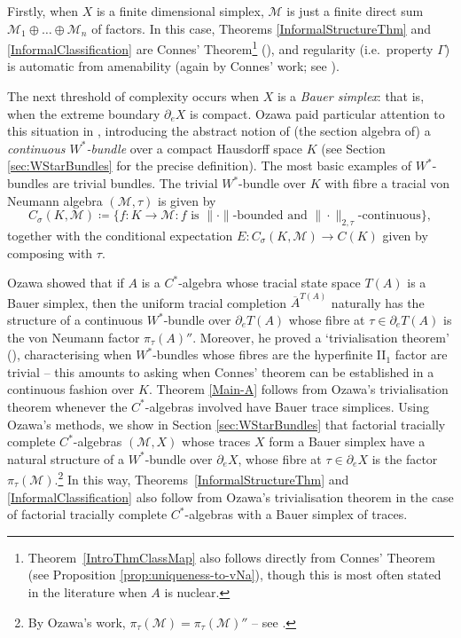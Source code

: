 \documentclass[a4paper,11pt]{amsart}
\theoremstyle{definition}
\numberwithin{equation}{section}
\numberwithin{theorem}{section}
\newcommand{\M}{\mathcal{M}}
\newcommand{\completion}[2]{\overline{#1}^{#2}}
\begin{document}
Firstly, when $X$ is a finite dimensional simplex, $\M$ is just a finite direct sum $\mathcal M_1\oplus\dots\oplus \M_n$ of factors.  In this case, Theorems \ref{InformalStructureThm} and \ref{InformalClassification} are Connes' Theorem\footnote{Theorem~\ref{IntroThmClassMap} also follows directly from Connes' Theorem (see Proposition \ref{prop:uniqueness-to-vNa}), though this is most often stated in the literature when $A$ is nuclear.} (\cite{Co76}), and regularity (i.e.\ property $\Gamma$) is automatic from amenability (again by Connes' work; see \cite[Corollary 2.2]{Co76}).

The next threshold of complexity occurs when $X$ is a \emph{Bauer simplex}: that is, when the extreme boundary $\partial_eX$ is compact. Ozawa paid particular attention to this situation in \cite{Oz13}, introducing the abstract notion of (the section algebra of) a \emph{continuous $W^*$-bundle} over a compact Hausdorff space $K$ (see Section \ref{sec:WStarBundles} for the precise definition).  The most basic examples of $W^*$-bundles are trivial bundles.  The trivial $W^*$-bundle over $K$ with fibre a tracial von Neumann algebra $(\mathcal M,\tau)$ is given by
\begin{equation}
C_\sigma(K,\mathcal M)\!\coloneqq\! \{f\colon\! K\to \mathcal M:f\text{ is }\|\cdot\|\text{-bounded and }\|\cdot\|_{2,\tau}\text{-continuous}\},
\end{equation}
together with the conditional expectation $E \colon C_\sigma(K, \mathcal M) \rightarrow C(K)$ given by composing with $\tau$.

Ozawa showed that if $A$ is a $C^*$-algebra whose tracial state space $T(A)$ is a Bauer simplex, then the uniform tracial completion $\completion{A}{T(A)}$ naturally has the structure of a continuous $W^*$-bundle over $\partial_eT(A)$ whose fibre at $\tau \in \partial_e T(A)$ is the von Neumann factor $\pi_\tau(A)''$. Moreover, he proved a `trivialisation theorem' (\cite[Theorem 15]{Oz13}), characterising when $W^*$-bundles whose fibres are the hyperfinite II$_1$ factor are trivial -- this amounts to asking when Connes' theorem can be established in a continuous fashion over $K$. Theorem \ref{Main-A} follows from Ozawa's trivialisation theorem whenever the $C^*$-algebras involved have Bauer trace simplices. Using Ozawa's methods, we show in Section \ref{sec:WStarBundles} that factorial tracially complete $C^*$-algebras $(\M,X)$ whose traces $X$ form a Bauer simplex have a natural structure of a $W^*$-bundle over $\partial_eX$, whose fibre at $\tau \in \partial_e X$ is the factor $\pi_\tau(\M)$.\footnote{By Ozawa's work, $\pi_\tau(\M)=\pi_\tau(\M)''$ -- see \cite[Theorem~11]{Oz13}.} 
In this way, Theorems~\ref{InformalStructureThm} and \ref{InformalClassification} also follow from Ozawa's trivialisation theorem in the case of factorial tracially complete $C^*$-algebras with a Bauer simplex of traces.
\end{document}
